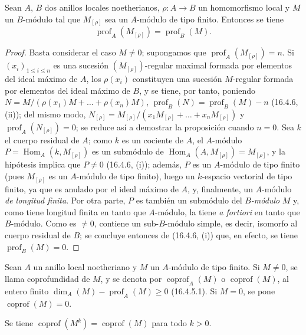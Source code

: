 \begin{proposition}[16.4.8]
\label{0.16.4.8-fr}
Sean $A$, $B$ dos anillos locales noetherianos,
$\rho:A\to B$ un homomorfismo local y $M$ un $B$-módulo tal que
$M_{[\rho]}$ sea un $A$-módulo de tipo finito. Entonces se tiene
\begin{equation}
\label{0.16.4.8.1-fr}
\tag{16.4.8.1}
  \operatorname{prof}_A(M_{[\rho]})=\operatorname{prof}_B(M).
\end{equation}
\end{proposition}

\begin{proof}
Basta considerar el caso $M\neq0$; supongamos que
$\operatorname{prof}_A(M_{[\rho]})=n$. Si $(x_i)_{1\leq i\leq n}$ es una
sucesión $(M_{[\rho]})$-regular maximal formada por elementos del ideal máximo
de $A$, los $\rho(x_i)$ constituyen una sucesión $M$-regular formada por
elementos del ideal máximo de $B$, y se tiene, por tanto, poniendo
$N=M/(\rho(x_1)M+\ldots+\rho(x_n)M)$,
$\operatorname{prof}_B(N)=\operatorname{prof}_B(M)-n$ (16.4.6, (ii)); del
mismo modo,
$N_{[\rho]}=M_{[\rho]}/(x_1M_{[\rho]}+\ldots+x_nM_{[\rho]})$ y
$\operatorname{prof}_A(N_{[\rho]})=0$; se reduce así a demostrar la
proposición cuando $n=0$. Sea $k$ el cuerpo residual de $A$; como $k$ es un
cociente de $A$, el $A$-módulo
$P=\operatorname{Hom}_A(k,M_{[\rho]})$ es un submódulo de
$\operatorname{Hom}_A(A,M_{[\rho]})=M_{[\rho]}$, y la hipótesis implica que
$P\neq0$ (16.4.6, (i)); además, $P$ es un $A$-módulo de tipo finito
(pues $M_{[\rho]}$ es un $A$-módulo de tipo finito), luego un $k$-espacio
vectorial de tipo finito, ya que es anulado por el ideal máximo de $A$, y,
finalmente, un $A$-módulo \emph{de longitud finita}. Por otra parte, $P$ es también un
submódulo del \emph{$B$-módulo} $M$ y, como tiene longitud finita en tanto que
$A$-módulo, la tiene \emph{a fortiori} en tanto que $B$-módulo. Como es
$\neq0$, contiene un sub-$B$-módulo simple, es decir, isomorfo al cuerpo
residual de $B$; se concluye entonces de (16.4.6, (i)) que, en efecto, se tiene
$\operatorname{prof}_B(M)=0$.
\end{proof}

\begin{definition}[16.4.9]
\label{0.16.4.9-fr}
Sean $A$ un anillo local noetheriano y $M$ un $A$-módulo de tipo finito. Si
$M\neq0$, se llama coprofundidad de $M$, y se denota por
$\operatorname{coprof}_A(M)$ o $\operatorname{coprof}(M)$, al entero finito
$\dim_A(M)-\operatorname{prof}_A(M)\geq0$ (16.4.5.1). Si $M=0$, se pone
$\operatorname{coprof}(M)=0$.

Se tiene $\operatorname{coprof}(M^k)=\operatorname{coprof}(M)$ para todo
$k>0$.
\end{definition}

